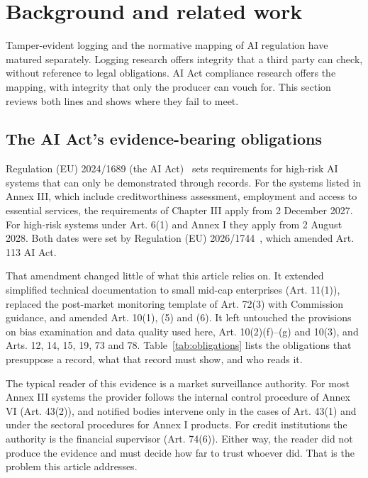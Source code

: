 \section{Background and related work}
\label{sec:background}

Tamper-evident logging and the normative mapping of AI regulation have matured separately. Logging research offers integrity that a third party can check, without reference to legal obligations. AI Act compliance research offers the mapping, with integrity that only the producer can vouch for. This section reviews both lines and shows where they fail to meet.

\subsection{The AI Act's evidence-bearing obligations}

Regulation (EU) 2024/1689 (the AI Act)~\cite{ai_act} sets requirements for high-risk AI systems that can only be demonstrated through records. For the systems listed in Annex III, which include creditworthiness assessment, employment and access to essential services, the requirements of Chapter III apply from 2 December 2027. For high-risk systems under Art. 6(1) and Annex I they apply from 2 August 2028. Both dates were set by Regulation (EU) 2026/1744~\cite{omnibus_2026}, which amended Art. 113 AI Act.

That amendment changed little of what this article relies on. It extended simplified technical documentation to small mid-cap enterprises (Art. 11(1)), replaced the post-market monitoring template of Art. 72(3) with Commission guidance, and amended Art. 10(1), (5) and (6). It left untouched the provisions on bias examination and data quality used here, Art. 10(2)(f)--(g) and 10(3), and Arts. 12, 14, 15, 19, 73 and 78. Table~\ref{tab:obligations} lists the obligations that presuppose a record, what that record must show, and who reads it.



The typical reader of this evidence is a market surveillance authority. For most Annex III systems the provider follows the internal control procedure of Annex VI (Art. 43(2)), and notified bodies intervene only in the cases of Art. 43(1) and under the sectoral procedures for Annex I products. For credit institutions the authority is the financial supervisor (Art. 74(6)). Either way, the reader did not produce the evidence and must decide how far to trust whoever did. That is the problem this article addresses.

